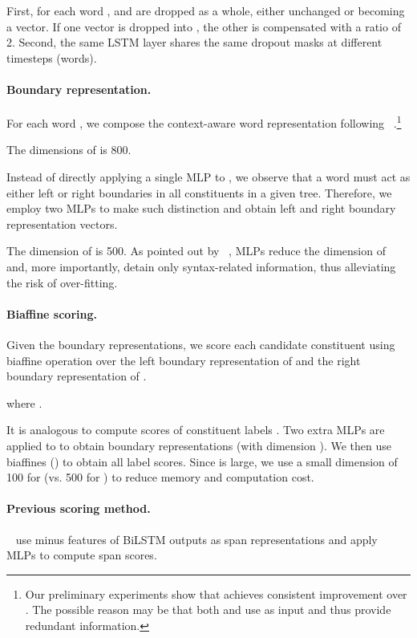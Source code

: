 \documentclass{article}
\begin{document}
First, for each word ,  and  are dropped as a whole, either unchanged or becoming a  vector.
If one vector is dropped into , the other is compensated with a ratio of 2.
Second, the same LSTM layer shares the same dropout masks at different timesteps (words).





\paragraph{Boundary representation.}

For each word , we compose the context-aware word representation following \citeauthor{stern-etal-2017-minimal}~.\footnote{Our preliminary experiments show that  achieves consistent improvement over . The possible reason may be that both  and  use  as input and thus provide redundant information.}

The dimensions of  is 800.

Instead of directly applying a single MLP to ,
we observe that a word must act as either left or right boundaries in all constituents in a given tree.
Therefore, we employ two MLPs to make such distinction and obtain left and right boundary representation vectors.

The dimension  of  is 500.
As pointed out by \citeauthor{Timothy-d17-biaffine}~, MLPs reduce the dimension of  and, more importantly, detain only syntax-related information, thus alleviating the risk of over-fitting.


\paragraph{Biaffine scoring.}

Given the boundary representations,
we score each candidate constituent  using biaffine operation
over the left boundary representation of  and the right boundary representation of .

where .


It is analogous to compute scores of constituent labels .
Two extra MLPs are applied to  to obtain boundary representations  (with dimension ).
We then use  biaffines () to obtain all label scores.
Since  is large, we use a small dimension  of 100 for  (vs. 500 for ) to reduce memory and computation cost.

\paragraph{Previous scoring method.}
\citeauthor{stern-etal-2017-minimal}~ use minus features of BiLSTM outputs as span representations \cite{wang-chang-2016-graph,cross-huang-2016-span} and apply MLPs to compute span scores.
\end{document}

